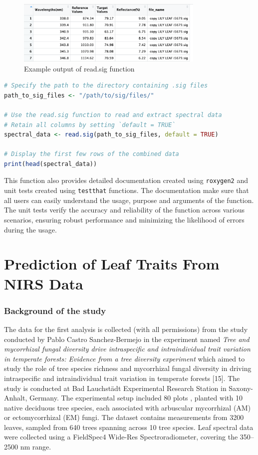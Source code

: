 \documentclass[12pt,a4paper]{report}
\begin{document}
\begin{figure}[h]
    \centering
    \includegraphics[width=0.8\textwidth]{Figures/read_sig.png}
    \caption{Example output of read.sig function}
    \label{fig:read_sig}
\end{figure}

\begin{lstlisting}[language=R, style=mystyle]
# Specify the path to the directory containing .sig files
path_to_sig_files <- "/path/to/sig/files/"

# Use the read.sig function to read and extract spectral data
# Retain all columns by setting `default = TRUE`
spectral_data <- read.sig(path_to_sig_files, default = TRUE)

# Display the first few rows of the combined data
print(head(spectral_data))
\end{lstlisting}

This function also provides detailed documentation created using \texttt{roxygen2} and unit tests created using \texttt{testthat} functions. The documentation make sure that all users can easily understand the  usage, purpose and arguments of the function. The unit tests verify the accuracy and reliability of the function across various scenarios, ensuring robust performance and minimizing the likelihood of errors during the usage.

\section{Prediction of Leaf Traits From NIRS Data} 
\subsubsection*{Background of the study}
The data for the first analysis is collected (with all permissions) from the study conducted by Pablo Castro Sanchez-Bermejo in the experiment named \textit{Tree and mycorrhizal fungal diversity drive intraspecific and intraindividual trait variation in temperate forests: Evidence from a tree diversity experiment} which aimed to study the role of tree species richness and mycorrhizal fungal diversity in driving intraspecific and intraindividual trait variation in temperate forests [15]. The study is conducted at Bad Lauchstädt Experimental Research Station in Saxony-Anhalt, Germany. The experimental setup included 80 plots , planted with 10 native deciduous tree species, each associated with arbuscular mycorrhizal (AM) or ectomycorrhizal (EM) fungi. The dataset contains measurements from 3200 leaves, sampled from 640 trees spanning across 10 tree species. Leaf spectral data were collected using a FieldSpec4 Wide-Res Spectroradiometer, covering the 350–2500 nm range.
\end{document}
